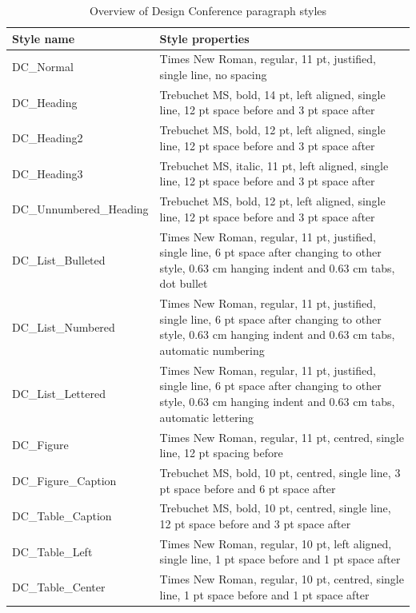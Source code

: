 \documentclass{design}
\begin{document}
\begin{table}[h!]
    \centering
    \small
    \caption{Overview of Design Conference paragraph styles}
    \label{tab:two}
    \begin{tabular}{ |l|L{0.7\textwidth}| }
        \hline
        \textbf{Style name} & \textbf{Style properties} \\
        \hline
        DC\_Normal &Times New Roman, regular, 11 pt, justified, single line, no spacing \\ \hline
        DC\_Heading & Trebuchet MS, bold, 14 pt, left aligned, single line, 12 pt space before and 3 pt space after \\ \hline
        DC\_Heading2 & Trebuchet MS, bold, 12 pt, left aligned, single line, 12 pt space before and 3 pt space after \\ \hline
        DC\_Heading3 & Trebuchet MS, italic, 11 pt, left aligned, single line, 12 pt space before and 3 pt space after \\ \hline
        DC\_Unnumbered\_Heading & Trebuchet MS, bold, 12 pt, left aligned, single line, 12 pt space before and 3 pt space after \\ \hline
        DC\_List\_Bulleted & Times New Roman, regular, 11 pt, justified, single line, 6 pt space after changing to other style, 0.63 cm hanging indent and 0.63 cm tabs, dot bullet \\ \hline
        DC\_List\_Numbered & Times New Roman, regular, 11 pt, justified, single line, 6 pt space after changing to other style, 0.63 cm hanging indent and 0.63 cm tabs, automatic numbering \\ \hline
        DC\_List\_Lettered & Times New Roman, regular, 11 pt, justified, single line, 6 pt space after changing to other style, 0.63 cm hanging indent and 0.63 cm tabs, automatic lettering \\ \hline
        DC\_Figure & Times New Roman, regular, 11 pt, centred, single line, 12 pt spacing before \\ \hline
        DC\_Figure\_Caption & Trebuchet MS, bold, 10 pt, centred, single line, 3 pt space before and 6 pt space after \\ \hline
        DC\_Table\_Caption & Trebuchet MS, bold, 10 pt, centred, single line, 12 pt space before and 3 pt space after \\ \hline
        DC\_Table\_Left & Times New Roman, regular, 10 pt, left aligned, single line, 1 pt space before and 1 pt space after \\ \hline
        DC\_Table\_Center & Times New Roman, regular, 10 pt, centred, single line, 1 pt space before and 1 pt space after \\ \hline

\end{tabular}
\end{table}
\end{document}
